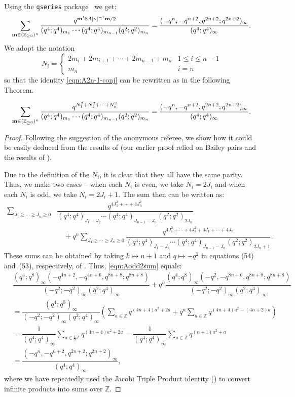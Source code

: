 \documentclass[ALCO,Unicode,published]{cedram}
\newcommand{\ZZ}{\mathbb{Z}}
\begin{document}
Using the {\tt qseries} package~\cite{Ga} we get:
\begin{align}
\sum_{{\bf m} \in (\mathbb{Z}_{\ge 0})^n} \frac{q^{{\bf m}^t 8A[\nu]^{-1} {\bf m}/2}}{(q^4;q^4)_{m_1} \cdots (q^4;q^4)_{m_{n-1}}(q^2; q^2)_{m_n}}
= \frac{(-q^{n},-q^{n+2},q^{2n+2};q^{2n+2})_\infty}{(q^4;q^4)_\infty}.
\label{eqn:A2n-1-conj}
\end{align}
We adopt the notation
\begin{equation}
N_i = \begin{cases} 2m_i + 2m_{i+1} + \cdots + 2m_{n-1} + m_n & 1 \le i \le n-1\\
m_n & i=n
\end{cases}
\end{equation}
so that the identity \ref{eqn:A2n-1-conj} can be rewritten as in the following Theorem.
\begin{thm}
$$\sum_{{\bf m} \in (\mathbb{Z}_{\ge 0})^n} \frac{q^{N_1^2 + N_2^2 + \cdots  + N_n^2}}{(q^4;q^4)_{m_1} \cdots (q^4;q^4)_{m_{n-1}}(q^2; q^2)_{m_n}} 
= \frac{(-q^{n},-q^{n+2},q^{2n+2};q^{2n+2})_\infty}{(q^4;q^4)_\infty}.
$$
\end{thm}
\begin{proof}
Following the suggestion of the anonymous referee, we show how it could be easily deduced from the results of \cite{Pau} (our earlier proof relied on Bailey pairs and the results of \cite{And-mult}).

Due to the definition of the $N_i$, it is clear that they all have the same parity.
Thus, we make two cases -- when each $N_i$ is even, we take $N_i=2J_i$ and when
each $N_i$ is odd, we take $N_i=2J_i+1$.
The sum then can be written as:
\begin{align}
    \sum_{J_1\geq\cdots\geq J_n\geq 0}&
    \dfrac{q^{4J_1^2+\cdots+4J_n^2}}
    {(q^4;q^4)_{J_1-J_2}\cdots (q^4;q^4)_{J_{n-1}-J_n}(q^2;q^2)_{2J_n}}
    \nonumber\\
    &\quad 
    +q^n\sum_{J_1\geq \cdots\geq J_n\geq 0}
    \dfrac{q^{4J_1^2+\cdots+4J_k^2+4J_1+\cdots+4J_n}}
    {(q^4;q^4)_{J_1-J_2}\cdots (q^4;q^4)_{J_{n-1}-J_n}(q^2;q^2)_{2J_n+1}}.
    \label{eqn:Aodd2sum}
\end{align}
These sums can be obtained by taking $k\mapsto n+1$ and $q\mapsto -q^{2}$ in equations (54) and~(53), respectively, of \cite{Pau}.
Thus, \eqref{eqn:Aodd2sum} equals:
\begin{align*}
&	\dfrac{(q^{4};q^{8})_\infty(-q^{4n+2},-q^{4n+6},q^{8n+8};q^{8n+8})}{(-q^2;-q^2)_\infty(q^2;q^4)_\infty}
+ q^n	\dfrac{(q^{4};q^{8})_\infty(-q^{2},-q^{8n+6},q^{8n+8};q^{8n+8})}{(-q^2;-q^2)_\infty(q^2;q^4)_\infty}\\
&=
\dfrac{(q^{4};q^{8})_\infty}{(-q^2;-q^2)_\infty(q^2;q^4)_\infty}
\left(\sum_{a\in\ZZ} q^{(4n+4)a^2+2a} +q^n\sum_{a\in\ZZ}q^{(4n+4)a^2-(4n+2)a} \right)
\\
&=
\dfrac{1}{(q^4;q^4)_\infty}
\sum_{a\in\frac{1}{2}\ZZ} q^{(4n+4)a^2+2a}
=
\dfrac{1}{(q^4;q^4)_\infty}
\sum_{a\in\ZZ} q^{(n+1)a^2+a}\\
&=
\dfrac{(-q^{n},-q^{n+2},q^{2n+2};q^{2n+2})_\infty}{(q^4;q^4)_\infty},
\end{align*}
where we have repeatedly used the Jacobi Triple Product identity (\cite[Theorem 2.8]{And-book}) to convert infinite products into sums over $\ZZ$.
\end{proof}
\end{document}
